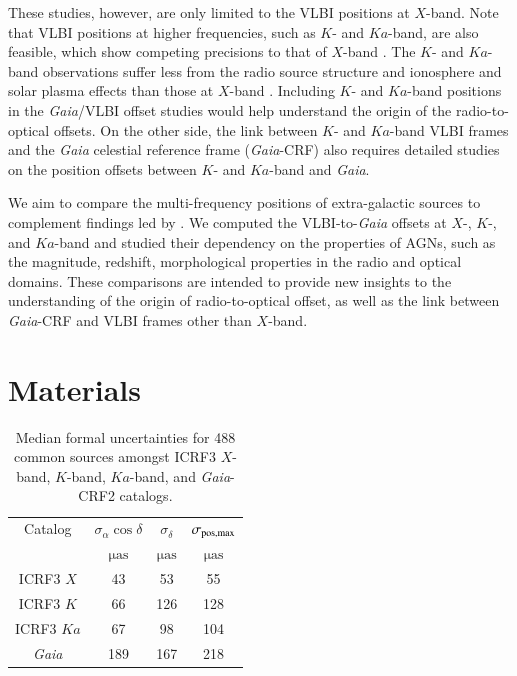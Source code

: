 \documentclass[referee]{aa}        %
\begin{document}
   These studies, however, are only limited to the VLBI positions at $X$-band.
   Note that VLBI positions at higher frequencies, such as $K$- and $Ka$-band, are also feasible, which show competing precisions to that of $X$-band \citep[e.g.,][]{2019evga.confP.302J,2019evga.confP.306D}.
   The $K$- and $Ka$-band observations suffer less from the radio source structure and ionosphere and solar plasma effects than those at $X$-band \citep[e.g.,][]{2002ivsg.conf..350J}.
   Including $K$- and $Ka$-band positions in the \textit{Gaia}/VLBI offset studies would help understand the origin of the radio-to-optical offsets.
   On the other side, the link between $K$- and $Ka$-band VLBI frames and the \textit{Gaia} celestial reference frame (\textit{Gaia}-CRF) also requires detailed studies on the position offsets between $K$- and $Ka$-band and \textit{Gaia}.

   We aim to compare the multi-frequency positions of extra-galactic sources to complement findings led by \citet{2019MNRAS.482.3023P}.
   We computed the VLBI-to-\textit{Gaia} offsets at $X$-, $K$-, and $Ka$-band and studied their dependency on the properties of AGNs, such as the magnitude, redshift, morphological properties in the radio and optical domains.
   These comparisons are intended to provide new insights to the understanding of the origin of radio-to-optical offset, as well as the link between \textit{Gaia}-CRF and VLBI frames other than $X$-band.


\section{Materials}    \label{sec:obs}

    \begin{table}[htbp]
        \centering
        \caption{\label{tab:median-err}
            Median formal uncertainties for 488 common sources amongst ICRF3 $X$-band, $K$-band, $Ka$-band, and \textit{Gaia}-CRF2 catalogs.
        }
        \begin{tabular}{cccc}
            \hline \noalign{\smallskip}
            Catalog &$\sigma_\alpha\cos\delta$  &$\sigma_\delta$  &$\sigma_{\rm pos,max}$\\
            & $\mathrm{\mu as}$ & $\mathrm{\mu as}$  & $\mathrm{\mu as}$ \\
            \noalign{\smallskip}
            \hline
            \noalign{\smallskip}
            ICRF3 $X$      & 43  & 53  & 55  \\
            ICRF3 $K$      & 66  &126  &128  \\
            ICRF3 $Ka$     & 67  & 98  &104  \\
            \textit{Gaia}  &189  &167  &218 \\
            \hline
        \end{tabular}
    \end{table}
\end{document}
